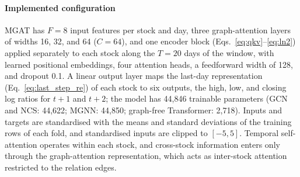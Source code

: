 \documentclass[pdflatex,sn-mathphys-num]{sn-jnl}%
\theoremstyle{thmstyleone}%
\theoremstyle{thmstyletwo}%
\theoremstyle{thmstylethree}%
\begin{document}
\paragraph{Implemented configuration}
{\color{blue}MGAT has $F=8$ input features per stock and day, three graph-attention layers of widths 16, 32, and 64 ($C=64$), and one encoder block (Eqs.~\eqref{eq:qkv}--\eqref{eq:ln2}) applied separately to each stock along the $T=20$ days of the window, with learned positional embeddings, four attention heads, a feedforward width of 128, and dropout 0.1. A linear output layer maps the last-day representation (Eq.~\eqref{eq:last_step_re}) of each stock to six outputs, the high, low, and closing log ratios for $t+1$ and $t+2$; the model has 44{,}846 trainable parameters (GCN and NCS: 44{,}622; MGNN: 44{,}850; graph-free Transformer: 2{,}718). Inputs and targets are standardised with the means and standard deviations of the training rows of each fold, and standardised inputs are clipped to $[-5,5]$. Temporal self-attention operates within each stock, and cross-stock information enters only through the graph-attention representation, which acts as inter-stock attention restricted to the relation edges.\par}
\end{document}
